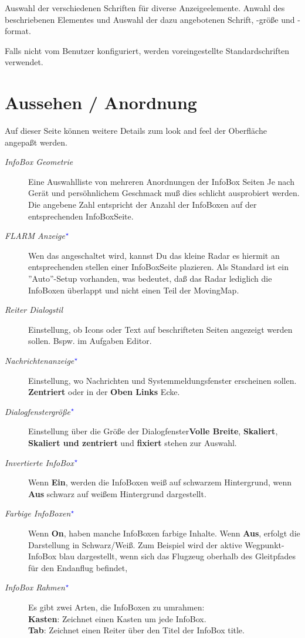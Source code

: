 Auswahl der verschiedenen Schriften für diverse Anzeigeelemente. Anwahl des beschriebenen
Elementes und Auswahl der dazu angebotenen Schrift, -größe und -format.


Falls nicht vom Benutzer konfiguriert, werden voreingestellte Standardschriften verwendet.


\vspace{5em}
\section{Aussehen / Anordnung}\label{sec:interface-appearance}

Auf dieser Seite können weitere Details zum look and feel der Oberfläche
angepaßt werden.


\begin{description}
\item[\textit{InfoBox Geometrie}]  Eine Auswahlliste von mehreren Anordnungen der InfoBox Seiten Je nach Gerät und persöhnlichem
Geschmack muß dies schlicht ausprobiert werden. Die angebene Zahl entspricht der Anzahl der InfoBoxen auf der entsprechenden InfoBoxSeite.
\item[\textit{FLARM Anzeige$^{\textcolor{blue}{\star}}$}]  \label{conf:flarmradar-place}
Wen das \fl angeschaltet wird, kannst Du das kleine \fl Radar es hiermit an entsprechenden stellen einer InfoBoxSeite plazieren.
Als Standard ist ein ''Auto''-Setup vorhanden, was bedeutet, daß das Radar lediglich die InfoBoxen
überlappt und nicht einen Teil der MovingMap.
\item[\textit{Reiter Dialogstil}] Einstellung, ob Icons oder Text auf beschrifteten Seiten angezeigt werden sollen.
Bspw. im Aufgaben Editor.
\item[\textit{Nachrichtenanzeige$^{\textcolor{blue}{\star}}$}]  Einstellung, wo Nachrichten und Systemmeldungsfenster
erscheinen sollen.   {\bf Zentriert} oder in der {\bf Oben Links} Ecke.
\item[\textit{Dialogfenstergröße$^{\textcolor{blue}{\star}}$}]  Einstellung über die Größe der Dialogfenster{\bf Volle Breite},  {\bf Skaliert},  {\bf Skaliert und zentriert} und {\bf fixiert} stehen zur Auswahl.
\item[\textit{Invertierte InfoBox$^{\textcolor{blue}{\star}}$}]  Wenn {\bf Ein}, werden die InfoBoxen weiß auf schwarzem Hintergrund, wenn {\bf Aus} schwarz auf weißem Hintergrund dargestellt.
\item[\textit{Farbige InfoBoxen$^{\textcolor{blue}{\star}}$}]  Wenn {\bf On}, haben manche InfoBoxen farbige Inhalte. Wenn {\bf Aus}, erfolgt die Darstellung in Schwarz/Weiß.
Zum Beispiel wird der aktive Wegpunkt-InfoBox  blau dargestellt, wenn sich das Flugzeug oberhalb des Gleitpfades für den Endanflug  befindet,
\item[\textit{InfoBox Rahmen$^{\textcolor{blue}{\star}}$}]  Es gibt zwei Arten, die InfoBoxen zu umrahmen:\\
  {\bf Kasten}: Zeichnet einen Kasten um jede InfoBox.\\
  {\bf Tab}: Zeichnet einen Reiter über den Titel der InfoBox
  title. \\
\end{description}


